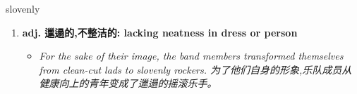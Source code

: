 
\begin{frame}
{\huge slovenly}
\begin{center}
\begin{enumerate}\Large
  \item \textbf{adj. 邋遢的,不整洁的: lacking neatness in dress or person}
  \begin{itemize}
    \item \em{\Large{For the sake of their image, the band members transformed themselves from clean-cut lads to slovenly rockers. 为了他们自身的形象,乐队成员从健康向上的青年变成了邋遢的摇滚乐手。}}
  \end{itemize}
\end{enumerate}
\end{center}
\end{frame}
